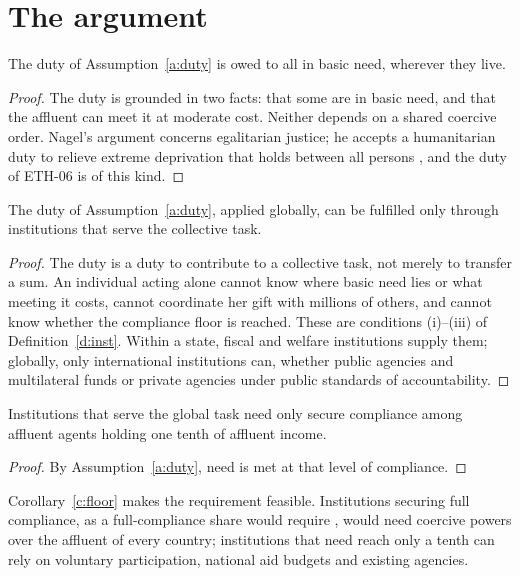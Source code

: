 \documentclass{situationist-preprint}
\begin{document}
\section{The argument}

\begin{proposition}[Globality]\label{p:global}
The duty of Assumption~\ref{a:duty} is owed to all in basic need, wherever they live.
\end{proposition}

\begin{proof}
The duty is grounded in two facts: that some are in basic need, and that the affluent can meet it at moderate cost. Neither depends on a shared coercive order. Nagel's argument concerns egalitarian justice; he accepts a humanitarian duty to relieve extreme deprivation that holds between all persons \citep{Nagel2005}, and the duty of ETH-06 is of this kind.
\end{proof}

\begin{proposition}\label{p:inst}
The duty of Assumption~\ref{a:duty}, applied globally, can be fulfilled only through institutions that serve the collective task.
\end{proposition}

\begin{proof}
The duty is a duty to contribute to a collective task, not merely to transfer a sum. An individual acting alone cannot know where basic need lies or what meeting it costs, cannot coordinate her gift with millions of others, and cannot know whether the compliance floor is reached. These are conditions (i)--(iii) of Definition~\ref{d:inst}. Within a state, fiscal and welfare institutions supply them; globally, only international institutions can, whether public agencies and multilateral funds or private agencies under public standards of accountability.
\end{proof}

\begin{corollary}\label{c:floor}
Institutions that serve the global task need only secure compliance among affluent agents holding one tenth of affluent income.
\end{corollary}

\begin{proof}
By Assumption~\ref{a:duty}, need is met at that level of compliance.
\end{proof}

Corollary~\ref{c:floor} makes the requirement feasible. Institutions securing full compliance, as a full-compliance share would require \citep{Murphy2000}, would need coercive powers over the affluent of every country; institutions that need reach only a tenth can rely on voluntary participation, national aid budgets and existing agencies.
\end{document}
